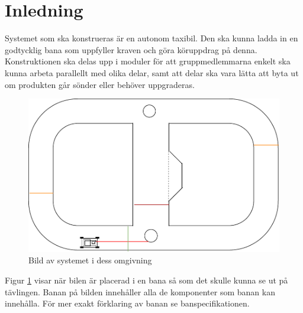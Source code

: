 \documentclass[systemskiss/skiss.tex]{subfiles}
\begin{document}
\section{Inledning}
Systemet som ska konstrueras är en autonom taxibil. Den ska kunna ladda in en godtycklig bana som uppfyller kraven och göra köruppdrag på denna. Konstruktionen ska delas upp i moduler för att gruppmedlemmarna enkelt ska kunna arbeta parallellt med olika delar, samt att delar ska vara lätta att byta ut om produkten går sönder eller behöver uppgraderas.

\begin{figure}[h]
    \centering
    \includegraphics[width=0.6\linewidth]{systemskiss/figures/systemomgivning.pdf}
    \caption{Bild av systemet i dess omgivning}
    \label{fig:omgivning}
\end{figure}
\noindent
Figur \ref{fig:omgivning} visar när bilen är placerad i en bana så som det
skulle kunna se ut på tävlingen. Banan på bilden innehåller alla de komponenter
som banan kan innehålla. För mer exakt förklaring av banan se banspecifikationen.
\end{document}
